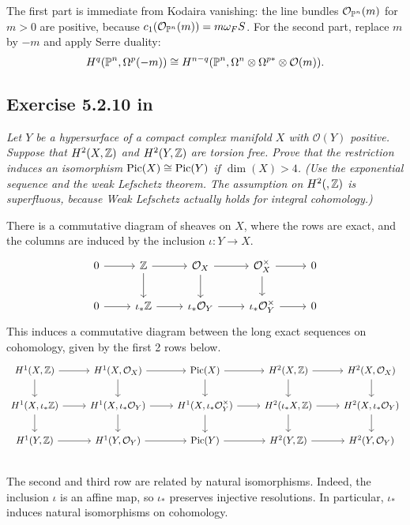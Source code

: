 \documentclass{article}
\begin{document}
The first part is immediate from Kodaira vanishing: the line bundles $\mathcal{O}_{\operatorname{\mathbb{P}}^n}(m)$ for $m>0$ are positive,
because $c_1(\mathcal{O}_{\operatorname{\mathbb{P}}^n}(m)) = m \omega_FS$. For the second part, replace $m$ by $-m$ and apply Serre duality:
\[	H^q(\operatorname{\mathbb{P}}^n, \Omega^p(-m)) \cong H^{n-q}(\operatorname{\mathbb{P}}^n, \Omega^n \otimes \Omega^{p*} \otimes \mathcal{O}(m)).	\]


\subsection*{Exercise 5.2.10 in \cite{Huy}}
\emph{Let $Y$ be a hypersurface of a compact complex manifold $X$ with $\mathcal{O}(Y)$
positive. Suppose that $H^2(X,\mathbb{Z})$ and $H^2(Y, \mathbb{Z})$ are torsion free. Prove that the restriction
induces an isomorphism $\operatorname{Pic}(X) \cong \operatorname{Pic}(Y)$ if $\dim(X) > 4$. (Use the exponential
sequence and the weak Lefschetz theorem. The assumption on $H^2( , \mathbb{Z})$ is
superfluous, because Weak Lefschetz actually holds for integral cohomology.)}
\vspace{3mm}

There is a commutative diagram of sheaves on $X$, where the rows are exact, and the columns are induced by
the inclusion $\iota :Y \to X$.
\[
\begin{tikzcd}
0\arrow{r} & \Z \arrow{r}\arrow{d} & \mathcal{O}_X \arrow{r}\arrow{d} & \mathcal{O}_X^{\times} \arrow{r}\arrow{d} & 0 \\
0\arrow{r} & \iota_*\Z \arrow{r} & \iota_*\mathcal{O}_Y \arrow{r} & \iota_*\mathcal{O}_Y^{\times} \arrow{r} & 0
\end{tikzcd}
\]
This induces a commutative diagram between the long exact sequences on cohomology, given by the first 2 rows below.
\[
\begin{tikzcd}
H^1(X,\Z)\arrow{r}\arrow{d} & H^1(X,\mathcal{O}_X)\arrow{r}\arrow{d} & \Pic(X) \arrow{r}\arrow{d} & 
H^2(X,\Z)\arrow{r}\arrow{d} & H^2(X,\mathcal{O}_X)\arrow{d} \\
H^1(X,\iota_*\Z)\arrow{r}\arrow{d} & H^1(X,\iota_*\mathcal{O}_Y)\arrow{r}\arrow{d} & 
H^1(X,\iota_*\mathcal{O}_Y^{\times}) \arrow{r}\arrow{d} &
H^2(\iota_*X,\Z)\arrow{r}\arrow{d} & H^2(X,\iota_*\mathcal{O}_Y)\arrow{d} \\
H^1(Y,\Z)\arrow{r} & H^1(Y,\mathcal{O}_Y)\arrow{r} & \Pic(Y) \arrow{r} & H^2(Y,\Z)\arrow{r} & H^2(Y,\mathcal{O}_Y) \\
\end{tikzcd}
\]
The second and third row are related by natural isomorphisms. Indeed, the inclusion $\iota$ is an affine map,
so $\iota_*$ preserves injective resolutions. In particular, $\iota_*$ induces natural isomorphisms on cohomology.
\end{document}
